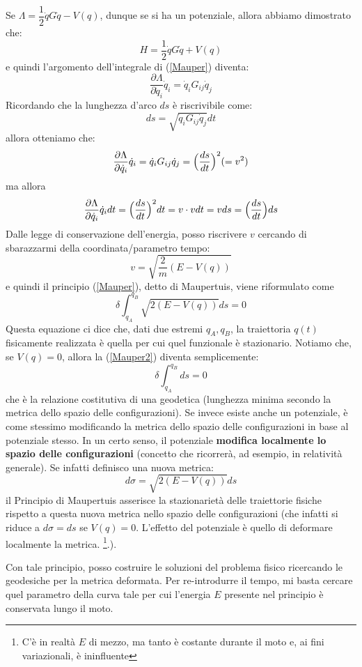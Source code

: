 \documentclass[a4paper,openany]{article}
\begin{document}
	Se $\Lambda = \dfrac{1}{2}\dot{q}G\dot{q} - V(q)$, dunque se si ha un potenziale, allora abbiamo dimostrato che:
	$$
	H = \dfrac{1}{2}\dot{q}G\dot{q} + V(q)
	$$
	e quindi l'argomento dell'integrale di (\ref{Mauper}) diventa:
	$$
	\dfrac{\partial \Lambda}{\partial \dot{q}_i} \dot{q}_i = \dot{q}_iG_{ij}\dot{q}_j
	$$
	Ricordando che la lunghezza d'arco $ds$ è riscrivibile come:
	$$
	ds = \sqrt{\dot{q}_i G_{ij} \dot{q}_j} dt
	$$
	allora otteniamo che:
	$$
	\dfrac{\partial \Lambda}{\partial \dot{q}_i} \dot{q}_i = \dot{q}_iG_{ij}\dot{q}_j = \Bigl(\dfrac{ds}{dt}\Bigl)^2 (= v^2)
	$$
	ma allora 
	$$
	\dfrac{\partial \Lambda}{\partial \dot{q}_i} \dot{q}_i dt = \Bigl(\dfrac{ds}{dt}\Bigl)^2 dt = v \cdot vdt = v ds = \Bigl(\dfrac{ds}{dt}\Bigl) ds
	$$
	Dalle legge di conservazione dell'energia, posso riscrivere $v$ cercando di sbarazzarmi della coordinata/parametro tempo:
	$$
	v = \sqrt{\dfrac{2}{m}(E-V(q))}
	$$
	e quindi il principio (\ref{Mauper}), detto di Maupertuis, viene riformulato come
	\begin{equation}
		\delta \int_{q_A}^{q_B} \sqrt{2(E-V(q))} ds = 0
		\label{Mauper2}
	\end{equation}
	Questa equazione ci dice che, dati due estremi $q_A, q_B$, la traiettoria $q(t)$ fisicamente realizzata è quella per cui quel funzionale è stazionario. Notiamo che, se $V(q)=0$, allora la (\ref{Mauper2}) diventa semplicemente:
	\begin{equation}\label{key}
		\delta \int_{q_A}^{q_B}  ds = 0
	\end{equation}
	che è la relazione costitutiva di una geodetica (lunghezza minima secondo la metrica dello spazio delle configurazioni). Se invece esiste anche un potenziale, è come stessimo modificando la metrica dello spazio delle configurazioni in base al potenziale stesso. In un certo senso, il potenziale \textbf{modifica localmente  lo spazio delle configurazioni } (concetto che ricorrerà, ad esempio, in relatività generale).  Se infatti definisco una nuova metrica:
	$$
	d\sigma = \sqrt{2(E-V(q))} ds 
	$$
	il Principio di Maupertuis asserisce la stazionarietà delle traiettorie fisiche rispetto a questa nuova metrica nello spazio delle configurazioni (che infatti si riduce a $d\sigma = ds$ se $V(q)=0$. L'effetto del potenziale è quello di deformare localmente la metrica. \footnote{C'è in realtà $E$ di mezzo, ma tanto è costante durante il moto e, ai fini variazionali, è ininfluente}.). 
	
	
	Con tale principio, posso costruire le soluzioni del problema fisico ricercando le geodesiche per la metrica deformata. Per re-introdurre il tempo, mi basta cercare quel parametro della curva tale per cui l'energia $E$ presente nel principio è conservata lungo il moto.
	
\end{document}
